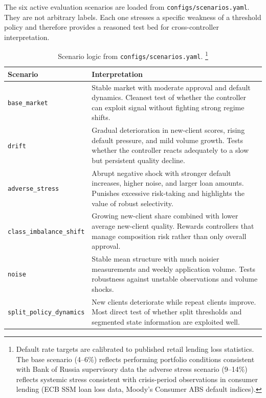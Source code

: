 \documentclass[12pt,a4paper]{article}
\begin{document}
The six active evaluation scenarios are loaded from \texttt{configs/scenarios.yaml}. They are not arbitrary labels. Each one stresses a specific weakness of a threshold policy and therefore provides a reasoned test bed for cross-controller interpretation.

\begin{table}[H]
    \centering
    \small
    \begin{tabularx}{0.98\textwidth}{p{}X}
        \toprule
        Scenario                         & Interpretation                                                                                                                                                                        \\
        \midrule
        \texttt{base\_market}            & Stable market with moderate approval and default dynamics. Cleanest test of whether the controller can exploit signal without fighting strong regime shifts.                          \\
        \texttt{drift}                   & Gradual deterioration in new-client scores, rising default pressure, and mild volume growth. Tests whether the controller reacts adequately to a slow but persistent quality decline. \\
        \texttt{adverse\_stress}         & Abrupt negative shock with stronger default increases, higher noise, and larger loan amounts. Punishes excessive risk-taking and highlights the value of robust selectivity.          \\
        \texttt{class\_imbalance\_shift} & Growing new-client share combined with lower average new-client quality. Rewards controllers that manage composition risk rather than only overall approval.                          \\
        \texttt{noise}                   & Stable mean structure with much noisier measurements and weekly application volume. Tests robustness against unstable observations and volume shocks.                                 \\
        \texttt{split\_policy\_dynamics} & New clients deteriorate while repeat clients improve. Most direct test of whether split thresholds and segmented state information are exploited well.                                \\
        \bottomrule
    \end{tabularx}
    \caption{Scenario logic from \texttt{configs/scenarios.yaml}.%
        \protect\footnote{Default rate targets are calibrated to published retail
            lending loss statistics. The base scenario (4--6\%) reflects performing
            portfolio conditions consistent with Bank of Russia supervisory data
            the adverse stress scenario (9--14\%) reflects systemic stress consistent
            with crisis-period observations in consumer lending
            (ECB SSM loan loss data, Moody's Consumer ABS default indices).}}
    \label{tab:en-scenarios}
\end{table}
\end{document}
